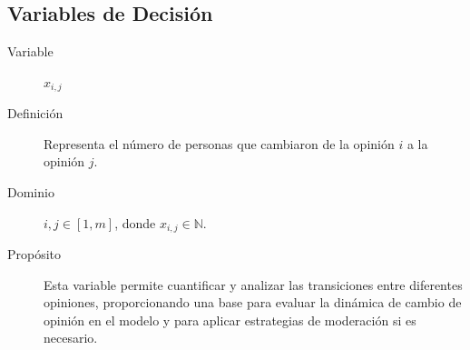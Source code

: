 \documentclass[11pt,letter]{article}
\begin{document}
\subsection{Variables de Decisión}
\begin{description}
    \item[Variable] $x_{i,j}$
    \item[Definici\'on] Representa el n\'umero de personas que cambiaron de la opini\'on $i$ a la opini\'on $j$.
    \item[Dominio] $i, j \in [1, m]$, donde $x_{i,j} \in \mathbb{N}$.
    \item[Prop\'osito] Esta variable permite cuantificar y analizar las transiciones entre diferentes opiniones, proporcionando una base para evaluar la din\'amica de cambio de opini\'on en el modelo y para aplicar estrategias de moderaci\'on si es necesario.
\end{description}
\end{document}
